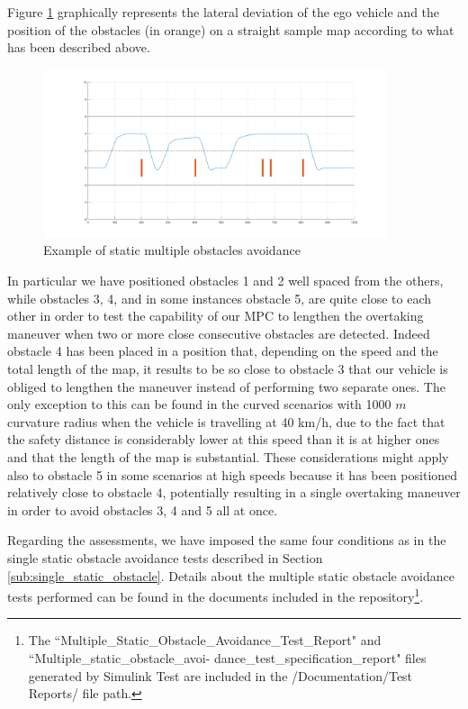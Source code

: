 \vspace{5mm}

Figure \ref{fig:obstacle} graphically represents the lateral deviation of the ego vehicle and the position of the obstacles (in orange) on a straight sample map according to what has been described above.


\begin{figure}[H]
    \centering
    \includegraphics[width=0.9\textwidth,keepaspectratio]{Figures/multiple.png}
    \caption{Example of static multiple obstacles avoidance}
    \label{fig:obstacle}
\end{figure}


In particular we have positioned obstacles 1 and 2 well spaced from the others, while obstacles 3, 4, and in some instances obstacle 5, are quite close to each other in order to test the capability of our MPC to lengthen the overtaking maneuver when two or more close consecutive obstacles are detected. Indeed obstacle 4 has been placed in a position that, depending on the speed and the total length of the map, it results to be so close to obstacle 3 that our vehicle is obliged to lengthen the maneuver instead of performing two separate ones. The only exception to this can be found in the curved scenarios with 1000 $m$ curvature radius when the vehicle is travelling at 40 km/h, due to the fact that the safety distance is considerably lower at this speed than it is at higher ones and that the length of the map is substantial.
These considerations might apply also to obstacle 5 in some scenarios at high speeds because it has been positioned relatively close to obstacle 4, potentially resulting in a single overtaking maneuver in order to avoid obstacles 3, 4 and 5 all at once.

Regarding the assessments, we have imposed the same four conditions as in the single static obstacle avoidance tests described in Section \ref{sub:single_static_obstacle}.
Details about the multiple static obstacle avoidance tests performed can be found in the documents included in the repository\footnote{The ``Multiple\_Static\_Obstacle\_Avoidance\_Test\_Report" and ``Multiple\_static\_obstacle\_avoi- dance\_test\_specification\_report" files generated by Simulink Test are included in the /Documentation/Test Reports/ file path.}.

